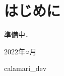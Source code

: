 \documentclass[../../main]{subfiles}
\begin{document}
\chapter{はじめに}
\thispagestyle{empty}
準備中．

\vspace{1\zh}
\begin{flushleft}
  \noindent\hspace{2\zw} 2022年○月
\end{flushleft}
\begin{flushright}
  calamari\_dev\hspace*{2\zw}
\end{flushright}
\end{document}
